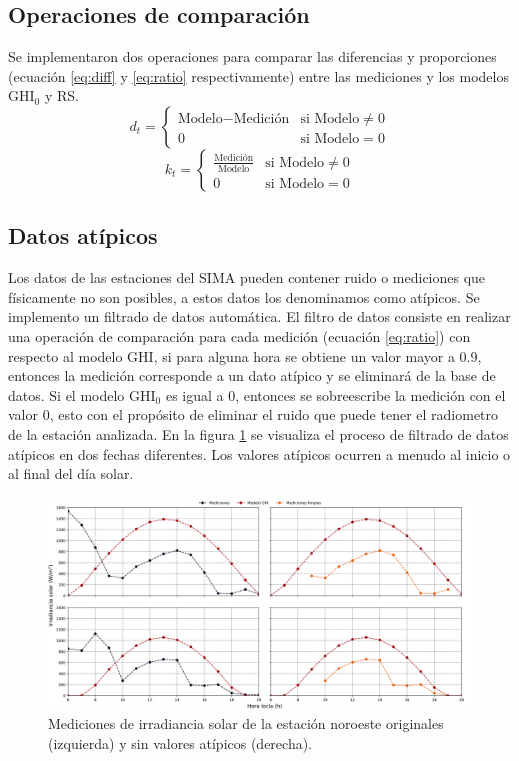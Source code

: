 \subsection{Operaciones de comparación}
Se implementaron dos operaciones para comparar las diferencias y proporciones (ecuación \ref{eq:diff} y \ref{eq:ratio} respectivamente) entre las mediciones y los modelos GHI$_0$ y RS.
\begin{equation}
	d_t = \begin{cases}
		\text{Modelo} - \text{Medición} & \text{si Modelo}\neq 0 \\
		0                               & \text{si Modelo} = 0
	\end{cases}
	\label{eq:diff}
\end{equation}
\begin{equation}
	k_t = \begin{cases}
		\frac{\text{Medición}}{\text{Modelo}} & \text{si Modelo}\neq 0 \\
		0                                     & \text{si Modelo} = 0
	\end{cases}
	\label{eq:ratio}
\end{equation}
\subsection{Datos atípicos}
Los datos de las estaciones del SIMA pueden contener ruido o mediciones que físicamente no son posibles, a estos datos los denominamos como atípicos. Se implemento un filtrado de datos automática. El filtro de datos consiste en realizar una operación de comparación para cada medición (ecuación \ref{eq:ratio}) con respecto al modelo GHI, si para alguna hora se obtiene un valor mayor a 0.9, entonces la medición corresponde a un dato atípico y se eliminará de la base de datos. Si el modelo GHI$_0$ es igual a 0, entonces se sobreescribe la medición con el valor 0, esto con el propósito de eliminar el ruido que puede tener el radiometro de la estación analizada. En la figura \ref{fig:example_clean_data} se visualiza el proceso de filtrado de datos atípicos en dos fechas diferentes. Los valores atípicos ocurren a menudo al inicio o al final del día solar.
\begin{figure}[H]
	\centering
	\includegraphics[width=12cm]{Graphics/example_clean_data.png}
	\caption{Mediciones de irradiancia solar de la estación noroeste originales (izquierda) y sin valores atípicos (derecha).}
	\label{fig:example_clean_data}
\end{figure}
